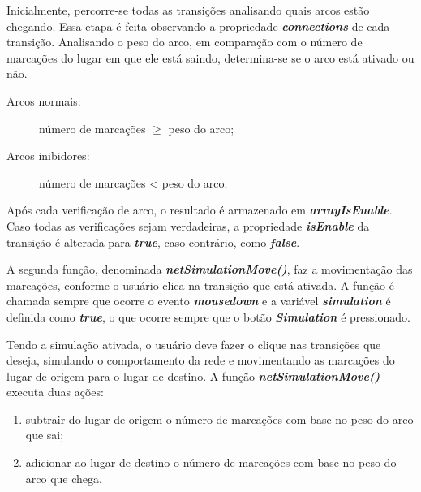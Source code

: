 \documentclass[
	12pt,				%
	openright,			%
	oneside,			%
	a4paper,			%
	english,			%
	brazil				%
	]{abntex2}
\begin{document}


Inicialmente, percorre-se todas as transições analisando quais arcos estão chegando. Essa etapa é feita observando a propriedade \textbf{\textit{connections}} de cada transição. Analisando o peso do arco, em comparação com o número de marcações do lugar em que ele está saindo, determina-se se o arco está ativado ou não.

\begin{description}
	\item[Arcos normais:] número de marcações $\geq$ peso do arco;
	\item[Arcos inibidores:] número de marcações < peso do arco.
\end{description}

Após cada verificação de arco, o resultado é armazenado em \textbf{\textit{arrayIsEnable}}. Caso todas as verificações sejam verdadeiras, a propriedade \textbf{\textit{isEnable}} da transição é alterada para \textbf{\textit{true}}, caso contrário, como \textbf{\textit{false}}. 

A segunda função, denominada \textbf{\textit{netSimulationMove()}}, faz a movimentação das marcações, conforme o usuário clica na transição que está ativada. A função é chamada sempre que ocorre o evento \textbf{\textit{mousedown}} e a variável \textbf{\textit{simulation}} é definida como \textbf{\textit{true}}, o que ocorre sempre que o botão \textbf{\textit{Simulation}} é pressionado.  



Tendo a simulação ativada, o usuário deve fazer o clique nas transições que deseja, simulando o comportamento da rede e movimentando as marcações do lugar de origem para o lugar de destino. A função \textbf{\textit{netSimulationMove()}} executa duas ações: 

\begin{enumerate}
	\item subtrair do lugar de origem o número de marcações com base no peso do arco que sai;
	\item adicionar ao lugar de destino o número de marcações com base no peso do arco que chega.
\end{enumerate}


\end{document}
